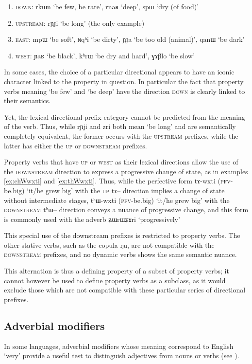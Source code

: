 \documentclass[oldfontcommands,oneside,a4paper,11pt]{article}
\newcommand{\ipa}[1]{{\phon \mbox{#1}}} %
\begin{document}
\begin{enumerate}
\item \textsc{down}: \ipa{rkɯn} `be few, be rare', \ipa{rnaʁ} `deep', \ipa{spɯ} `dry (of food)' 
\item \textsc{upstream}: \ipa{rɲɟi} `be long' (the only example)
\item \textsc{east}: \ipa{mpɯ} `be soft', \ipa{ɴqʰi} `be dirty', \ipa{ɲɟa} `be too old (animal)', \ipa{qanɯ} `be dark'
\item \textsc{west}: \ipa{ɲaʁ} `be black', \ipa{kʰrɯ} `be dry and hard', \ipa{ɣɤβlo} `be slow'
\end{enumerate}
In some cases, the choice of a particular directional appears to have an iconic character linked to the property in question. In particular the fact  that    property verbs meaning `be few' and `be deep'  have the direction \textsc{down} is clearly linked to their semantics.

Yet, the lexical directional prefix category cannot be predicted from the meaning of the verb. Thus, while \ipa{rɲji} and \ipa{zri} both mean `be long' and are semantically completely equivalent, the former occurs with the \textsc{upstream} prefixes, while the latter has either the \textsc{up} or \textsc{downstream} prefixes.


Property verbs that have \textsc{up} or \textsc{west} as their lexical directions allow the use of the \textsc{downstream} direction to express a progressive change of state, as in examples \ref{ex:chWwxti} and \ref{ex:thWwxti}.  Thus, while the perfective form \ipa{tɤ-wxti} (\textsc{pfv}-be.big) `it/he grew big' with the \textsc{up} \ipa{tɤ--} direction implies a change of state without intermediate stages,  \ipa{tʰɯ-wxti} (\textsc{pfv}-be.big) `it/he grew big' with the \textsc{downstream} \ipa{tʰɯ--} direction conveys a nuance of progressive change, and this form is commonly used with the adverb \ipa{ʑɯrɯʑɤri} `progressively'

 This special use of the downstream prefixes is restricted to property verbs. The other stative verbs, such as the copula \ipa{ŋu}, are not compatible with the \textsc{downstream} prefixes, and no dynamic verbs shows the same semantic nuance.
 
This alternation is thus a defining property of a subset of property verbs; it cannot however be used to define property verbs as a subclass, as it would exclude those which are not compatible with these particular series of directional prefixes.
\subsection{Adverbial modifiers}
In some languages, adverbial modifiers whose meaning correspond to English `very' provide a useful test to distinguish adjectives from nouns or verbs (see \citealt[27]{dixon04adjective}).
\end{document}
